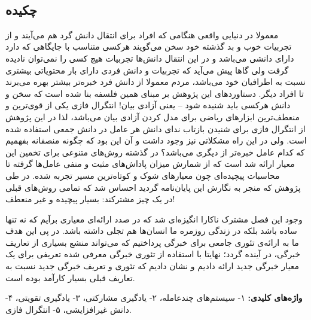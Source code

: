 
\setcounter{page}{1}
\thispagestyle{empty}

~\vfill

\subsection*{چکیده}
\begin{small}
\baselineskip=0.7cm
\vspace*{0.5 cm}

معمولا در دنیایی واقعی هنگامی که افراد برای انتقال دانش گرد هم می‌آیند و از تجربیات خوب و بد گذشته خود سخن می‌گویند هرکسی متناسب با جایگاهی که دارد دارای دانشی می‌باشد و در این انتقال دانش‌ها تجربیات هیچ کسی را نمی‌توان نادیده گرفت ولی گاها پیش می‌آید که تجربیات و دانش فردی دارای بار محتویاتی بیشتری نسبت به اطرافیان خود می‌باشد، مردم معمولا از دانش فرد خبره‌تر بیشتر بهره می‌برند تا افراد دیگر. دستاورد‌های این پژوهش بر مبنای همین فلسفه بنا شده است که سخن و دانش هرکسی باید شنیده شود -- یعنی آزادی بیان! انتگرال فازی یکی از قوی‌ترین و منعطف‌ترین ابزارهای ریاضی برای مدل کردن آزادی بیان می‌باشد، لذا در این پژوهش از انتگرال فازی برای شنیدن بازتاب ندای دانش هر عامل در دانش جمعی استفاده شده است. ولی در این راه مشکلاتی نیز وجود داشت و آن این بود که چگونه منصفانه بفهمیم که کدام عامل خبره‌تر از دیگری می‌باشد؟ در گذشته روش‌های متنوعی برای تخمین این معیار ارائه شد است که از شمارش میزان پاداش‌های مثبت و منفی عامل‌ها گرفته تا محاسبات پیچیده‌ای چون معیار‌های شوک و کوتاه‌ترین مسیر تجربه شده. در طی پژوهش که منجر به نگارش این پایان‌نامه گردید احساس شد که تمامی روش‌های قبلی در یک چیز مشترکند: بسیار پیچیده و غیر منعطف!

وجود این فصل مشترک ناکارا انگیزه‌ای شد که در صدد ارائه‌ای معیاری برآیم که نه تنها ساده باشد بلکه در زندگی روزمره ما انسان‌ها هم تجلی داشته باشد. در پی این هدف ما به ارائه‌ی تئوری جامعی برای خبرگی پرداختیم که می‌تواند منشع بسیاری از تعاریف خبرگی، در آینده گردد؛ نهایتا با استفاده از تئوری خبرگی معرفی شده تعریفی برای یک معیار خبرگی جدید ارائه دادیم و نشان دادیم که تئوری و تعریف خبرگی جدید نسبت به تعاریف قبلی بسیار کارآمد بوده است.

\noindent\textbf{واژه‌های کلیدی:}
۱- سیستم‌های چندعامله، ۲- یادگیری مشارکتی، ۳- یادگیری تقویتی، ۴- دانش غیرافزایشی، ۵- انتگرال فازی.
\end{small}